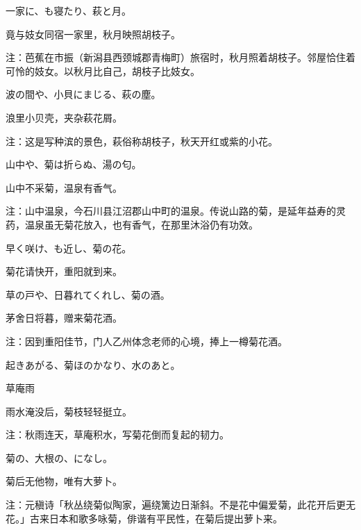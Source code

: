 \begin{haiku}
    {\FH 一家に、も寝たり、萩と月。}

    {\FK 竟与妓女同宿一家里，秋月映照胡枝子。}

    {\FT 注：芭蕉在市振（新潟县西颈城郡青梅町）旅宿时，秋月照着胡枝子。邻屋恰住着可怜的妓女。以秋月比自己，胡枝子比妓女。}
\end{haiku}

\begin{haiku}
    {\FH 波の間や、小貝にまじる、萩の塵。}

    {\FK 浪里小贝壳，夹杂萩花屑。}

    {\FT 注：这是写种滨的景色，萩俗称胡枝子，秋天开红或紫的小花。}
\end{haiku}

\begin{haiku}
    {\FH 山中や、菊は折らぬ、湯の匂。}

    {\FK 山中不采菊，温泉有香气。}

    {\FT 注：山中温泉，今石川县江沼郡山中町的温泉。传说山路的菊，是延年益寿的灵药，温泉虽无菊花放入，也有香气，在那里沐浴仍有功效。}
\end{haiku}

\begin{haiku}
    {\FH 早く咲け、も近し、菊の花。}

    {\FK 菊花请快开，重阳就到来。}
\end{haiku}

\begin{haiku}
    {\FH 草の戸や、日暮れてくれし、菊の酒。}

    {\FK 茅舍日将暮，赠来菊花酒。}

    {\FT 注：因到重阳佳节，门人乙州体念老师的心境，捧上一樽菊花酒。}
\end{haiku}

\begin{haiku}
    {\FH 起きあがる、菊ほのかなり、水のあと。}

    {\FK 草庵雨}

    {\FK 雨水淹没后，菊枝轻轻挺立。}

    {\FT 注：秋雨连天，草庵积水，写菊花倒而复起的韧力。}
\end{haiku}

\begin{haiku}
    {\FH 菊の、大根の、になし。}

    {\FK 菊后无他物，唯有大萝卜。}

    {\FT 注：元稹诗「秋丛绕菊似陶家，遍绕篱边日渐斜。不是花中偏爱菊，此花开后更无花。」古来日本和歌多咏菊，俳谐有平民性，在菊后提出萝卜来。}
\end{haiku}


